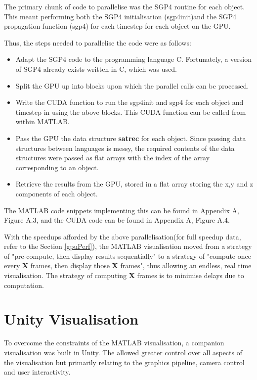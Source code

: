\documentclass[12pt,openany,a4paper]{book}
\begin{document}
		The primary chunk of code to parallelise was the SGP4 routine for each object. This meant performing both the SGP4 initialisation (sgp4init)and the SGP4 propagation function (sgp4) for each timestep for each object on the GPU. \newline
		
		Thus, the steps needed to parallelise the code were as follows:
		
		\begin{itemize}
			\item Adapt the SGP4 code to the programming language C. Fortunately, a version of SGP4 already exists written in C, which was used.
			\item Split the GPU up into blocks upon which the parallel calls can be processed.
			\item Write the CUDA function to run the sgp4init and sgp4 for each object and timestep in using the above blocks. This CUDA function can be called from within MATLAB.
			\item Pass the GPU the data structure \textbf{satrec} for each object. Since passing data structures between languages is messy, the required contents of the data structures were passed as flat arrays with the index of the array corresponding to an object.
			\item Retrieve the results from the GPU, stored in a flat array storing the x,y and z components of each object.
		\end{itemize}
		
		The MATLAB code snippets implementing this can be found in Appendix A, Figure A.3, and the CUDA code can be found in Appendix A, Figure A.4. \newline
		
		With the speedups afforded by the above parallelisation(for full speedup data, refer to the Section \ref{gpuPerf}), the MATLAB visualisation moved from a strategy of "pre-compute, then display results sequentially" to a strategy of "compute once every \textbf{X} frames, then display those \textbf{X} frames", thus allowing an endless, real time visualisation. The strategy of computing \textbf{X} frames is to minimise delays due to computation.
		
		\section{Unity Visualisation}
		
		To overcome the constraints of the MATLAB visualisation, a companion visualisation was built in Unity. The allowed greater control over all aspects of the visualisation but primarily relating to the graphics pipeline, camera control and user interactivity. \newline
		
\end{document}
